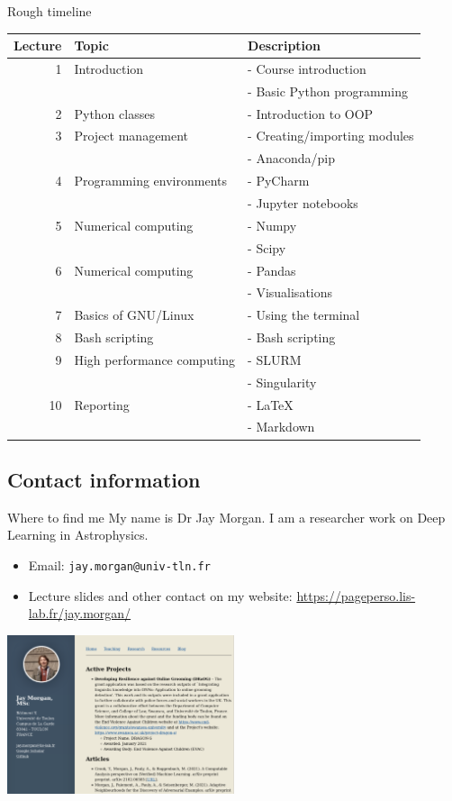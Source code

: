 \documentclass[10pt]{beamer}
\begin{document}
\begin{frame}[label={sec:org656baf8}]{Rough timeline}
\begin{center}
\scriptsize
\begin{tabular}{rll}
\toprule
Lecture & Topic & Description\\
\midrule
1 & Introduction & - Course introduction\\
 &  & - Basic Python programming\\
2 & Python classes & - Introduction to OOP\\
3 & Project management & - Creating/importing modules\\
 &  & - Anaconda/pip\\
4 & Programming environments & - PyCharm\\
 &  & - Jupyter notebooks\\
5 & Numerical computing & - Numpy\\
 &  & - Scipy\\
6 & Numerical computing & - Pandas\\
 &  & - Visualisations\\
7 & Basics of GNU/Linux & - Using the terminal\\
8 & Bash scripting & - Bash scripting\\
9 & High performance computing & - SLURM\\
 &  & - Singularity\\
10 & Reporting & - \LaTeX{}\\
 &  & - Markdown\\
\bottomrule
\end{tabular}
\end{center}
\end{frame}

\subsection{Contact information}
\label{sec:orga9fea99}

\begin{frame}[label={sec:org478533c},fragile]{Where to find me}
 My name is Dr Jay Morgan. I am a researcher work on Deep Learning in Astrophysics.

\begin{itemize}
\item Email: \texttt{jay.morgan@univ-tln.fr}
\item Lecture slides and other contact on my website: \url{https://pageperso.lis-lab.fr/jay.morgan/}
\end{itemize}

\begin{center}
\includegraphics[width=0.5\textwidth]{./images/website.png}
\end{center}
\end{frame}
\end{document}
